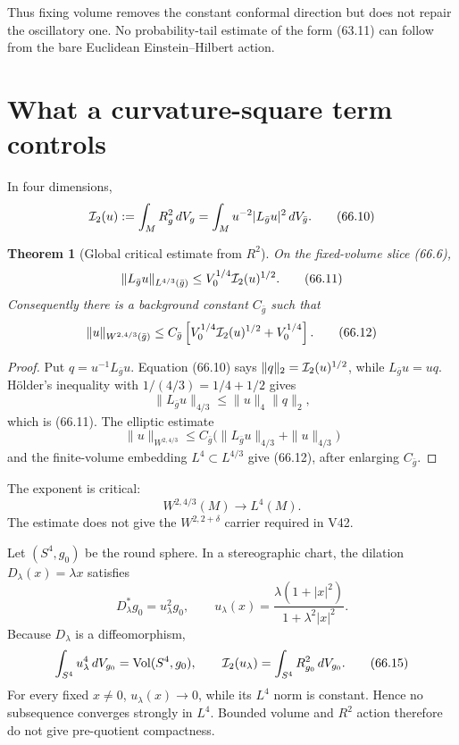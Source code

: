 \documentclass[11pt]{article}
\newtheorem{theorem}{Theorem}[section]
\theoremstyle{remark}
\begin{document}
Thus fixing volume removes the constant conformal direction but
does not repair the oscillatory one.  No probability-tail estimate
of the form (63.11) can follow from the bare Euclidean
Einstein--Hilbert action.

\section{What a curvature-square term controls}

In four dimensions,
\[
 {\cal I}_2(u)
 :=
 \int_MR_g^2\,dV_g
 =
 \int_Mu^{-2}|L_{\bar g}u|^2\,dV_{\bar g}.             \tag{66.10}
\]

\begin{theorem}[Global critical estimate from \(R^2\)]
\label{thm:v15v66-r2-critical}
On the fixed-volume slice (66.6),
\[
 \|L_{\bar g}u\|_{L^{4/3}(\bar g)}
 \leq
 V_0^{1/4}{\cal I}_2(u)^{1/2}.                        \tag{66.11}
\]
Consequently there is a background constant \(C_{\bar g}\) such
that
\[
 \|u\|_{W^{2,4/3}(\bar g)}
 \leq
 C_{\bar g}\left[
 V_0^{1/4}{\cal I}_2(u)^{1/2}
 +V_0^{1/4}
 \right].                                             \tag{66.12}
\]
\end{theorem}

\begin{proof}
Put \(q=u^{-1}L_{\bar g}u\).  Equation (66.10) says
\(\|q\|_2={\cal I}_2(u)^{1/2}\), while
\(L_{\bar g}u=uq\).  H\"older's inequality with
\(1/(4/3)=1/4+1/2\) gives
\[
 \|L_{\bar g}u\|_{4/3}
 \leq\|u\|_4\|q\|_2,
\]
which is (66.11).  The elliptic estimate
\[
 \|u\|_{W^{2,4/3}}
 \leq C_{\bar g}
 \bigl(\|L_{\bar g}u\|_{4/3}+\|u\|_{4/3}\bigr)
\]
and the finite-volume embedding \(L^4\subset L^{4/3}\) give
(66.12), after enlarging \(C_{\bar g}\).
\end{proof}

The exponent is critical:
\[
 W^{2,4/3}(M)\longrightarrow L^4(M).                  \tag{66.13}
\]
The estimate does not give the \(W^{2,2+\delta}\) carrier required
in V42.

\begin{counterexample}
\label{cnt:v15v66-mobius}
Let \((S^4,g_0)\) be the round sphere.  In a stereographic chart,
the dilation \(D_\lambda(x)=\lambda x\) satisfies
\[
 D_\lambda^*g_0=u_\lambda^2g_0,\qquad
 u_\lambda(x)=
 \frac{\lambda(1+|x|^2)}{1+\lambda^2|x|^2}.            \tag{66.14}
\]
Because \(D_\lambda\) is a diffeomorphism,
\[
 \int_{S^4}u_\lambda^4\,dV_{g_0}
 =\operatorname{Vol}(S^4,g_0),\qquad
 {\cal I}_2(u_\lambda)
 =\int_{S^4}R_{g_0}^2\,dV_{g_0}.                      \tag{66.15}
\]
For every fixed \(x\ne0\), \(u_\lambda(x)\to0\), while its
\(L^4\) norm is constant.  Hence no subsequence converges strongly
in \(L^4\).  Bounded volume and \(R^2\) action therefore do not give
pre-quotient compactness.
\end{counterexample}
\end{document}
